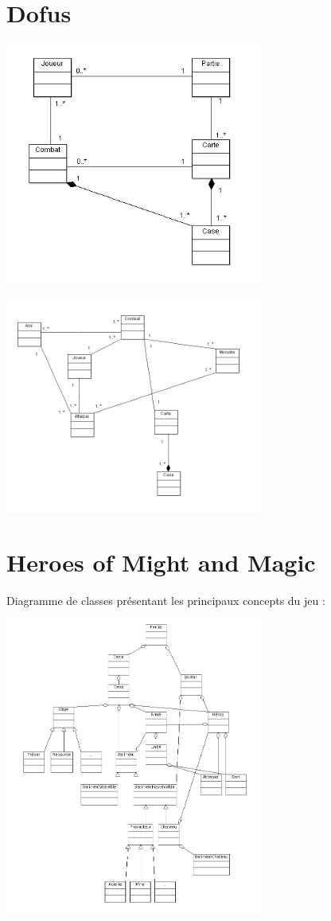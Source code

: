 \documentclass[a4paper,10pt]{report}
\begin{document}
	\section{Dofus}
	
		\includegraphics[width=320px]{diagrammes/classdiagram_dofus.png}
     
		\includegraphics[width=320px]{diagrammes/concept_dofus.png}


	\section{Heroes of Might and Magic}
	
    Diagramme de classes présentant les principaux concepts du jeu : 
    
		\includegraphics[width=320px]{diagrammes/heroes_of_might_and_magic.png}
\end{document}
